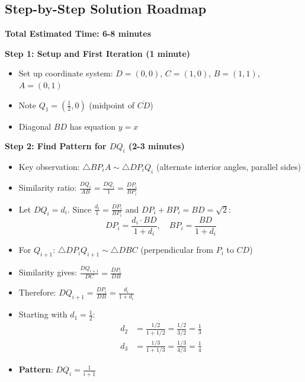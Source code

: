\documentclass[]{article}
\begin{document}
\begin{solutionbox}
\subsection*{Step-by-Step Solution Roadmap}

\textbf{Total Estimated Time: 6-8 minutes}

\textbf{Step 1: Setup and First Iteration (1 minute)}
\begin{itemize}
    \item Set up coordinate system: $D=(0,0)$, $C=(1,0)$, $B=(1,1)$, $A=(0,1)$
    \item Note $Q_1 = (\frac{1}{2}, 0)$ (midpoint of $\overline{CD}$)
    \item Diagonal $BD$ has equation $y = x$
\end{itemize}

\textbf{Step 2: Find Pattern for $DQ_i$ (2-3 minutes)}
\begin{itemize}
    \item Key observation: $\triangle BP_iA \sim \triangle DP_iQ_i$ (alternate interior angles, parallel sides)
    \item Similarity ratio: $\frac{DQ_i}{AB} = \frac{DQ_i}{1} = \frac{DP_i}{BP_i}$
    \item Let $DQ_i = d_i$. Since $\frac{d_i}{1} = \frac{DP_i}{BP_i}$ and $DP_i + BP_i = BD = \sqrt{2}$:
    \[DP_i = \frac{d_i \cdot BD}{1 + d_i}, \quad BP_i = \frac{BD}{1 + d_i}\]
    \item For $Q_{i+1}$: $\triangle DP_iQ_{i+1} \sim \triangle DBC$ (perpendicular from $P_i$ to $CD$)
    \item Similarity gives: $\frac{DQ_{i+1}}{DC} = \frac{DP_i}{DB}$
    \item Therefore: $DQ_{i+1} = \frac{DP_i}{DB} = \frac{d_i}{1 + d_i}$
    \item Starting with $d_1 = \frac{1}{2}$:
    \begin{align*}
        d_2 &= \frac{1/2}{1 + 1/2} = \frac{1/2}{3/2} = \frac{1}{3} \\
        d_3 &= \frac{1/3}{1 + 1/3} = \frac{1/3}{4/3} = \frac{1}{4}
    \end{align*}
    \item \textbf{Pattern}: $DQ_i = \frac{1}{i+1}$
\end{itemize}


\end{solutionbox}
\end{document}
